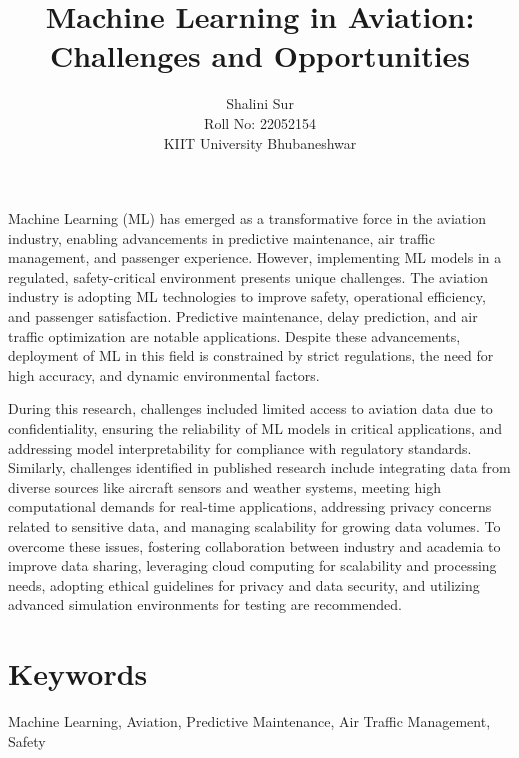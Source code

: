 \documentclass[12pt,a4paper]{article}
\title{\textbf{Machine Learning in Aviation: Challenges and Opportunities}}
\author{Shalini Sur \\ Roll No: 22052154 \\ KIIT University Bhubaneshwar}
\date{}
\begin{document}
\maketitle

\justify
Machine Learning (ML) has emerged as a transformative force in the aviation industry, enabling advancements in predictive maintenance, air traffic management, and passenger experience. However, implementing ML models in a regulated, safety-critical environment presents unique challenges. The aviation industry is adopting ML technologies to improve safety, operational efficiency, and passenger satisfaction. Predictive maintenance, delay prediction, and air traffic optimization are notable applications. Despite these advancements, deployment of ML in this field is constrained by strict regulations, the need for high accuracy, and dynamic environmental factors.

During this research, challenges included limited access to aviation data due to confidentiality, ensuring the reliability of ML models in critical applications, and addressing model interpretability for compliance with regulatory standards. Similarly, challenges identified in published research include integrating data from diverse sources like aircraft sensors and weather systems, meeting high computational demands for real-time applications, addressing privacy concerns related to sensitive data, and managing scalability for growing data volumes. To overcome these issues, fostering collaboration between industry and academia to improve data sharing, leveraging cloud computing for scalability and processing needs, adopting ethical guidelines for privacy and data security, and utilizing advanced simulation environments for testing are recommended.

\section*{Keywords}
Machine Learning, Aviation, Predictive Maintenance, Air Traffic Management, Safety
\end{document}
